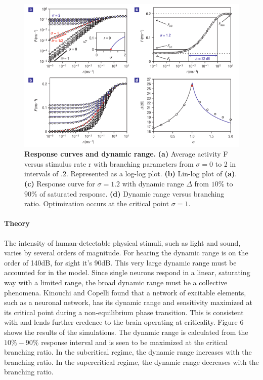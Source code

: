\documentclass[12pt]{article}
\begin{document}
\begin{figure}      
  \begin{center}    
 \includegraphics[width=.8\textwidth]{dynamicrangetheorycopelli}    
    \caption{\textbf{Response curves and dynamic range.} \textbf{(a)} Average activity F versus stimulus rate r with branching parameters from $\sigma = 0$ to 2 in intervals of .2. Represented as a log-log plot. \textbf{(b)} Lin-log plot of \textbf{(a)}. \textbf{(c)} Response curve for $\sigma = 1.2$ with dynamic range $\Delta$ from $10\%$ to $90\%$ of saturated response. \textbf{(d)} Dynamic range versus branching ratio. Optimization occurs at the critical point $\sigma = 1$.\cite{Kinouchi2006b}}   
   \label{Figure::Dynamic Range Theory}   
  \end{center}     
   \end{figure}
   
\paragraph{Theory}
The intensity of human-detectable physical stimuli, such as light and sound, varies by several orders of magnitude. For hearing the dynamic range is on the order of 140dB, for sight it's 90dB. This very large dynamic range must be accounted for in the model. Since single neurons respond in a linear, saturating way with a limited range, the broad dynamic range must be a collective phenomena. Kinouchi and Copelli found that a network of excitable elements, such as a neuronal network, has its dynamic range and sensitivity maximized at its critical point during a non-equilibrium phase transition\cite{Kinouchi2006b}. This is consistent with and lends further credence to the brain operating at criticality. Figure 6 shows the results of the simulations. The dynamic range is calculated from the $10\%-90\%$ response interval and is seen to be maximized at the critical branching ratio. In the subcritical regime, the dynamic range increases with the branching ratio. In the supercritical regime, the dynamic range decreases with the branching ratio. \cite{Larremore2011a, Larremore2012a}
\end{document}
